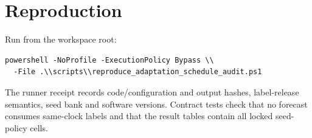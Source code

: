\documentclass[10pt]{article}
\begin{document}
\section{Reproduction}
Run from the workspace root:
\begin{verbatim}
powershell -NoProfile -ExecutionPolicy Bypass \\
  -File .\\scripts\\reproduce_adaptation_schedule_audit.ps1
\end{verbatim}
The runner receipt records code/configuration and output hashes, label-release semantics, seed bank and software versions. Contract tests check that no forecast consumes same-clock labels and that the result tables contain all locked seed-policy cells.
\end{document}
